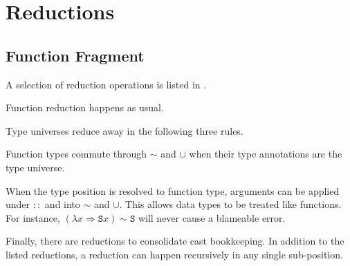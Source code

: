 \section{Reductions}
 
\subsection{Function Fragment}
A selection of reduction operations is listed in .

Function reduction happens as usual.
 
Type universes reduce away in the following three rules.
 
Function types commute through $\sim$ and $\cup$ when their type annotations are the type universe.
 
When the type position is resolved to function type, arguments can be applied under $::$ and into $\sim$ and $\cup$.
This allows data types to be treated like functions.
For instance, $(\lambda x \Rightarrow\mathtt{S} x) \sim\mathtt{S}$ will never cause a blameable error.
 
Finally, there are reductions to consolidate cast bookkeeping.
In addition to the listed reductions, a reduction can happen recursively in any single sub-position.




